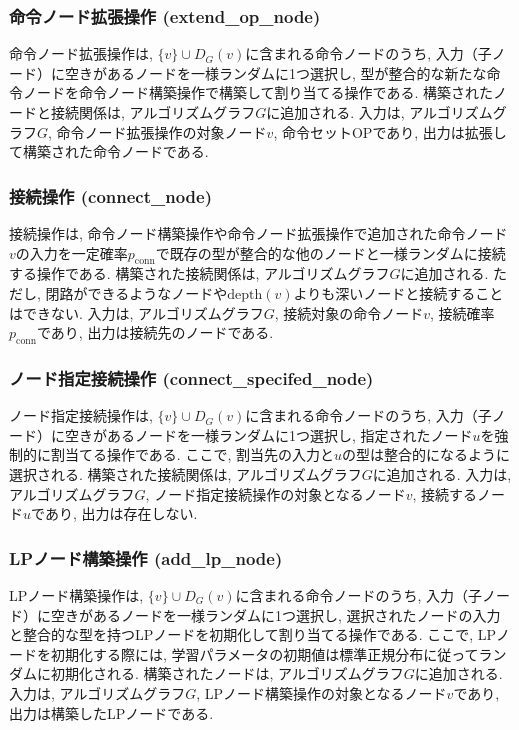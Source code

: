 \documentclass[11pt,oneside,openany,report]{jsbook}
\begin{document}
\subsubsection{命令ノード拡張操作 (extend\_op\_node)}
命令ノード拡張操作は, $\{v\} \cup D_G(v)$に含まれる命令ノードのうち, 入力（子ノード）に空きがあるノードを一様ランダムに1つ選択し, 型が整合的な新たな命令ノードを命令ノード構築操作で構築して割り当てる操作である. 構築されたノードと接続関係は, アルゴリズムグラフ$G$に追加される. 入力は, アルゴリズムグラフ$G$, 命令ノード拡張操作の対象ノード$v$, 命令セット$\mathrm{OP}$であり, 出力は拡張して構築された命令ノードである.

\subsubsection{接続操作 (connect\_node)}
接続操作は, 命令ノード構築操作や命令ノード拡張操作で追加された命令ノード$v$の入力を一定確率$p_\mathrm{conn}$で既存の型が整合的な他のノードと一様ランダムに接続する操作である. 構築された接続関係は, アルゴリズムグラフ$G$に追加される. ただし, 閉路ができるようなノードや$\mathrm{depth}(v)$よりも深いノードと接続することはできない. 入力は, アルゴリズムグラフ$G$, 接続対象の命令ノード$v$, 接続確率$p_\mathrm{conn}$であり, 出力は接続先のノードである.

\subsubsection{ノード指定接続操作 (connect\_specifed\_node)}
ノード指定接続操作は, $\{v\} \cup D_G(v)$に含まれる命令ノードのうち, 入力（子ノード）に空きがあるノードを一様ランダムに1つ選択し, 指定されたノード$u$を強制的に割当てる操作である. ここで, 割当先の入力と$u$の型は整合的になるように選択される. 構築された接続関係は, アルゴリズムグラフ$G$に追加される. 入力は, アルゴリズムグラフ$G$, ノード指定接続操作の対象となるノード$v$, 接続するノード$u$であり, 出力は存在しない.

\subsubsection{LPノード構築操作 (add\_lp\_node)}
LPノード構築操作は, $\{v\} \cup D_G(v)$に含まれる命令ノードのうち, 入力（子ノード）に空きがあるノードを一様ランダムに1つ選択し, 選択されたノードの入力と整合的な型を持つLPノードを初期化して割り当てる操作である. ここで, LPノードを初期化する際には, 学習パラメータの初期値は標準正規分布に従ってランダムに初期化される. 構築されたノードは, アルゴリズムグラフ$G$に追加される. 入力は, アルゴリズムグラフ$G$, LPノード構築操作の対象となるノード$v$であり, 出力は構築したLPノードである.
\end{document}
